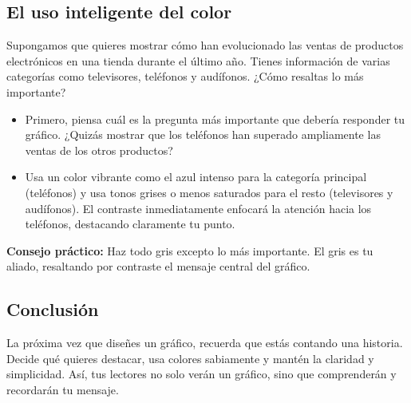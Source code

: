 \documentclass[
  spanish,
  letterpaper,
  DIV=11,
  numbers=noendperiod]{scrreprt}
\begin{document}
\section{El uso inteligente del
color}\label{el-uso-inteligente-del-color}

Supongamos que quieres mostrar cómo han evolucionado las ventas de
productos electrónicos en una tienda durante el último año. Tienes
información de varias categorías como televisores, teléfonos y
audífonos. ¿Cómo resaltas lo más importante?

\begin{itemize}
\item
  Primero, piensa cuál es la pregunta más importante que debería
  responder tu gráfico. ¿Quizás mostrar que los teléfonos han superado
  ampliamente las ventas de los otros productos?
\item
  Usa un color vibrante como el azul intenso para la categoría principal
  (teléfonos) y usa tonos grises o menos saturados para el resto
  (televisores y audífonos). El contraste inmediatamente enfocará la
  atención hacia los teléfonos, destacando claramente tu punto.
\end{itemize}

\textbf{Consejo práctico:} Haz todo gris excepto lo más importante. El
gris es tu aliado, resaltando por contraste el mensaje central del
gráfico.

\section{Conclusión}\label{conclusiuxf3n}

La próxima vez que diseñes un gráfico, recuerda que estás contando una
historia. Decide qué quieres destacar, usa colores sabiamente y mantén
la claridad y simplicidad. Así, tus lectores no solo verán un gráfico,
sino que comprenderán y recordarán tu mensaje.


\chapter{}\label{section}
\end{document}
